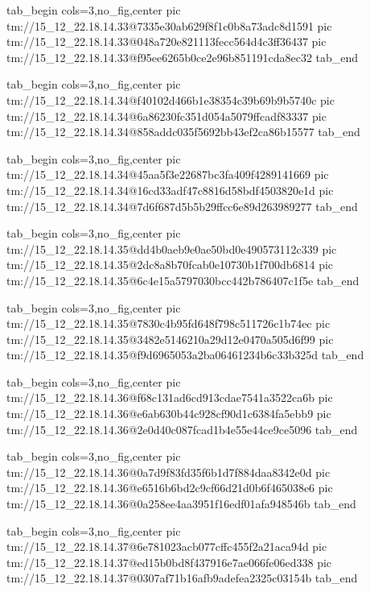  
 
 
 
 

\qqSecCmtScr


\ifcmt
  tab_begin cols=3,no_fig,center
    pic tm://15_12_22.18.14.33@7335e30ab629f8f1c0b8a73adc8d1591
    pic tm://15_12_22.18.14.33@048a720e821113fecc564d4c3ff36437
    pic tm://15_12_22.18.14.33@f95ee6265b0ce2e96b851191cda8ec32
  tab_end
\fi


\ifcmt
  tab_begin cols=3,no_fig,center
    pic tm://15_12_22.18.14.34@f40102d466b1e38354c39b69b9b5740c
    pic tm://15_12_22.18.14.34@6a86230fc351d054a5079ffcadf83337
    pic tm://15_12_22.18.14.34@858addc035f5692bb43ef2ca86b15577
  tab_end
\fi


\ifcmt
  tab_begin cols=3,no_fig,center
    pic tm://15_12_22.18.14.34@45aa5f3e22687bc3fa409f4289141669
    pic tm://15_12_22.18.14.34@16cd33adf47c8816d58bdf4503820e1d
    pic tm://15_12_22.18.14.34@7d6f687d5b5b29ffcc6e89d263989277
  tab_end
\fi


\ifcmt
  tab_begin cols=3,no_fig,center
    pic tm://15_12_22.18.14.35@dd4b0aeb9e0ae50bd0e490573112c339
    pic tm://15_12_22.18.14.35@2dc8a8b70fcab0e10730b1f700db6814
    pic tm://15_12_22.18.14.35@6c4e15a5797030bcc442b786407c1f5e
  tab_end
\fi


\ifcmt
  tab_begin cols=3,no_fig,center
    pic tm://15_12_22.18.14.35@7830c4b95fd648f798c511726c1b74ec
    pic tm://15_12_22.18.14.35@3482e5146210a29d12e0470a505d6f99
    pic tm://15_12_22.18.14.35@f9d6965053a2ba06461234b6c33b325d
  tab_end
\fi


\ifcmt
  tab_begin cols=3,no_fig,center
    pic tm://15_12_22.18.14.36@f68c131ad6cd913cdae7541a3522ca6b
    pic tm://15_12_22.18.14.36@e6ab630b44c928cf90d1c6384fa5ebb9
    pic tm://15_12_22.18.14.36@2e0d40c087fcad1b4e55e44ce9ce5096
  tab_end
\fi


\ifcmt
  tab_begin cols=3,no_fig,center
    pic tm://15_12_22.18.14.36@0a7d9f83fd35f6b1d7f884daa8342e0d
    pic tm://15_12_22.18.14.36@e6516b6bd2c9cf66d21d0b6f465038e6
    pic tm://15_12_22.18.14.36@0a258ee4aa3951f16edf01afa948546b
  tab_end
\fi


\ifcmt
  tab_begin cols=3,no_fig,center
    pic tm://15_12_22.18.14.37@6e781023acb077cffc455f2a21aca94d
    pic tm://15_12_22.18.14.37@ed15b0bd8f437916e7ae066fe06ed338
    pic tm://15_12_22.18.14.37@0307af71b16afb9adefea2325c03154b
  tab_end
\fi


